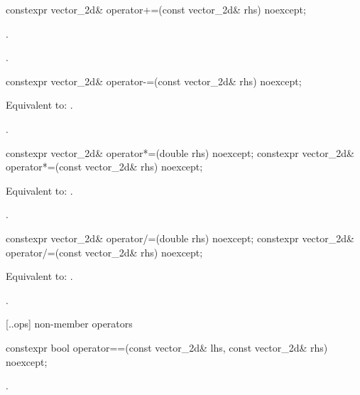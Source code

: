 %
\begin{itemdecl}
constexpr vector_2d& operator+=(const vector_2d& rhs) noexcept;
\end{itemdecl}
\begin{itemdescr}
\pnum
\effects
{}.
	
\pnum
\returns
{}.
\end{itemdescr}

%
\begin{itemdecl}
constexpr vector_2d& operator-=(const vector_2d& rhs) noexcept;
\end{itemdecl}
\begin{itemdescr}
\pnum
\effects
Equivalent to: .

\pnum
\returns
{}.
\end{itemdescr}

%
\begin{itemdecl}
constexpr vector_2d& operator*=(double rhs) noexcept;
constexpr vector_2d& operator*=(const vector_2d& rhs) noexcept;
\end{itemdecl}
\begin{itemdescr}
\pnum
\effects
Equivalent to: .

\pnum
\returns
{}.
\end{itemdescr}

%
\begin{itemdecl}
constexpr vector_2d& operator/=(double rhs) noexcept;
constexpr vector_2d& operator/=(const vector_2d& rhs) noexcept;
\end{itemdecl}
\begin{itemdescr}
\pnum
\effects
Equivalent to: .

\pnum
\returns
{}.
\end{itemdescr}

 [\iotwod.\vectortwod.ops] { non-member operators}

%
\begin{itemdecl}
constexpr bool operator==(const vector_2d& lhs, const vector_2d& rhs) noexcept;
\end{itemdecl}
\begin{itemdescr}
\pnum
\returns
{}.
\end{itemdescr}

